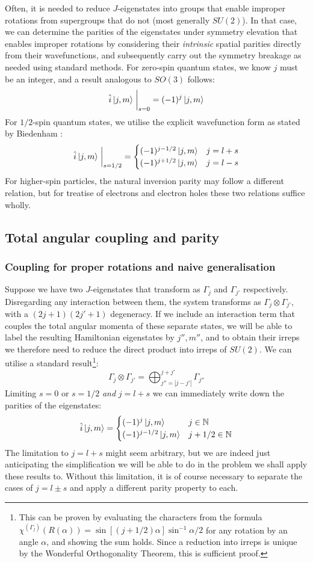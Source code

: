 \documentclass[12pt]{article}
\begin{document}
	Often, it is needed to reduce $J$-eigenstates into groups that enable improper rotations from supergroups that do not (most generally $SU(2)$). In that case, we can determine the parities of the eigenstates under symmetry elevation that enables improper rotations by considering their \textit{intrinsic} spatial parities directly from their wavefunctions, and subsequently carry out the symmetry breakage as needed using standard methods. For zero-spin quantum states, we know $j$ must be an integer, and a result analogous to $SO(3)$ follows:
	$$\hat{i}\ket{j,m}\eval_{s=0}=(-1)^j\ket{j,m}$$
	For $1/2$-spin quantum states, we utilise the explicit wavefunction form as stated by Biedenham \cite[p. 283]{spinor_spherical_harmonics}:
	$$\hat{i}\ket{j,m}\eval_{s=1/2}=
	\begin{cases}
	(-1)^{j-1/2}\ket{j,m} & j = l + s\\
	(-1)^{j+1/2}\ket{j,m} & j = l - s
	\end{cases}$$
	For higher-spin particles, the natural inversion parity may follow a different relation, but for treatise of electrons and electron holes these two relations suffice wholly.
	
	\subsection{Total angular coupling and parity}
	
	\subsubsection{Coupling for proper rotations and naive generalisation}
	Suppose we have two $J$-eigenstates that transform as $\Gamma_{j}$ and $\Gamma_{j'}$ respectively. Disregarding any interaction between them, the system transforms as $\Gamma_{j}\otimes\Gamma_{j'}$, with a $(2j+1)(2j'+1)$ degeneracy. If we include an interaction term that couples the total angular momenta of these separate states, we will be able to label the resulting Hamiltonian eigenstates by $j'',m''$, and to obtain their irreps we therefore need to reduce the direct product into irreps of $SU(2)$. We can utilise a standard result\footnote{This can be proven by evaluating the characters from the formula $\chi^{\left(\Gamma_j\right)}(R(\alpha))=\sin{\left[(j+1/2)\alpha\right]}\sin^{-1}\alpha/2$ for any rotation by an angle $\alpha$, and showing the sum holds. Since a reduction into irreps is unique by the Wonderful Orthogonality Theorem, this is sufficient proof.}:
	$$\Gamma_j\otimes\Gamma_{j'}=\bigoplus_{j''=|j-j'|}^{j+j'}\Gamma_{j''}$$
	Limiting $s=0$ or $s=1/2$ \textit{and} $j=l+s$ we can immediately write down the parities of the eigenstates:
	$$\hat{i}\ket{j,m}=\begin{cases}
	(-1)^j\ket{j,m} & j\in\mathbb{N}\\
	(-1)^{j-1/2}\ket{j,m} & j+1/2\in\mathbb{N}
	\end{cases}$$
	The limitation to $j=l+s$ might seem arbitrary, but we are indeed just anticipating the simplification we will be able to do in the problem we shall apply these results to. Without this limitation, it is of course necessary to separate the cases of $j=l\pm s$ and apply a different parity property to each.
	
\end{document}
